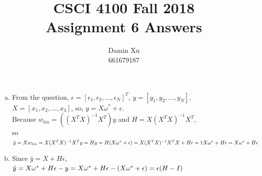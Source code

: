 \documentclass[11pt]{article}
\title{CSCI 4100 Fall 2018 \\
Assignment 6 Answers}
\author{Damin Xu\\661679187}
\begin{document}
\maketitle
\begin{enumerate} [(a)]
	\item From the question, $\epsilon = [\epsilon_1,\epsilon_2,...,\epsilon_N]^T$, $y = [y_1,y_2,...,y_N]$, $X = [x_1,x_2,...,x_3]$, so, $y = X\omega^*+\epsilon$.\\

	Because $w_{lin}=((X^TX)^{-1}X^T)y$ and $H=X(X^TX)^{-1}X^T$, \\so $\hat{y}=Xw_{lin}=X(X^TX)^{-1}X^Ty=Hy=H(X\omega^*+\epsilon)=X(X^TX)^{-1}X^TX+H\epsilon=1X\omega^*+H\epsilon\\=X\omega^*+H\epsilon$

	\item Since $\hat{y}=X+H\epsilon$,
	\\$\hat{y}=X\omega^*+H\epsilon-y = X\omega^*+H\epsilon-(X\omega^*+\epsilon)\\=\epsilon(H-I)$


\end{enumerate}
\end{document}
